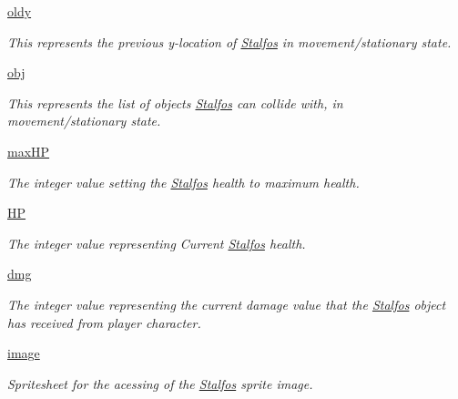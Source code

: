 \begin{DoxyCompactItemize}
\hyperlink{classactor_1_1stalfos_1_1_stalfos_a591766705ab3a05f6c09f71172c1a8c4}{oldy}
\begin{DoxyCompactList}\small\item\em This represents the previous y-\/location of \hyperlink{classactor_1_1stalfos_1_1_stalfos}{Stalfos} in movement/stationary state. \end{DoxyCompactList}\item 
\hyperlink{classactor_1_1stalfos_1_1_stalfos_a359a06edb086b7c8a5c2092c53ee1e38}{obj}
\begin{DoxyCompactList}\small\item\em This represents the list of objects \hyperlink{classactor_1_1stalfos_1_1_stalfos}{Stalfos} can collide with, in movement/stationary state. \end{DoxyCompactList}\item 
\hyperlink{classactor_1_1stalfos_1_1_stalfos_a43fcf57e6c8f01de5789d44065645d63}{max\+HP}
\begin{DoxyCompactList}\small\item\em The integer value setting the \hyperlink{classactor_1_1stalfos_1_1_stalfos}{Stalfos} health to maximum health. \end{DoxyCompactList}\item 
\hyperlink{classactor_1_1stalfos_1_1_stalfos_adff362c2a85501a23a65192fe991af3d}{HP}
\begin{DoxyCompactList}\small\item\em The integer value representing Current \hyperlink{classactor_1_1stalfos_1_1_stalfos}{Stalfos} health. \end{DoxyCompactList}\item 
\hyperlink{classactor_1_1stalfos_1_1_stalfos_a9d2a9b04c99612889141d0c89309beb1}{dmg}
\begin{DoxyCompactList}\small\item\em The integer value representing the current damage value that the \hyperlink{classactor_1_1stalfos_1_1_stalfos}{Stalfos} object has received from player character. \end{DoxyCompactList}\item 
\hyperlink{classactor_1_1stalfos_1_1_stalfos_a138d42da7f7b1333cc3739642c55673d}{image}
\begin{DoxyCompactList}\small\item\em Spritesheet for the acessing of the \hyperlink{classactor_1_1stalfos_1_1_stalfos}{Stalfos} sprite image. \end{DoxyCompactList}\item 

\end{DoxyCompactItemize}
